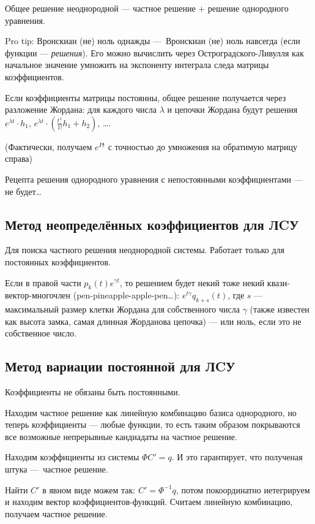 \documentclass[12pt, a4paper]{article}
\begin{document}
Общее решение неоднородной — частное решение + решение однородного уравнения.

Pro tip: Вронскиан (не) ноль однажды — Вронскиан (не) ноль навсегда (если функции — \textit{решения}).
Его можно вычислить через Остроградского-Ливулля как начальное значение умножить на экспоненту интеграла следа матрицы коэффициентов.

Если коэффициенты матрицы постоянны, общее решение получается через разложение Жордана: для каждого числа $\lambda$ и цепочки Жордана будут решения
$e^{\lambda t} \cdot h_1$, $e^{\lambda t} \cdot (\frac{t^{1}}{1!} h_1 + h_2)$, ….

(Фактически, получаем $e^{Pt}$ с точностью до умножения на обратимую матрицу справа)

Рецепта решения однородного уравнения с непостоянными коэффициентами — не будет…

\subsection{Метод неопределённых коэффициентов для ЛCУ}

Для поиска частного решения неоднородной системы.
Работает только для постоянных коэффициентов.

Если в правой части $p_k(t) e^{\gamma t}$, 
то решением будет некий тоже некий квази-вектор-многочлен (pen-pineapple-apple-pen…): 
$e^{t\gamma}q_{k + s}(t)$, где $s$ — максимальный 
размер клетки Жордана для собственного числа $\gamma$ (также известен как высота замка, 
самая длинная Жорданова цепочка)
— или ноль, если это не собственное число.

\subsection{Метод вариации постоянной для ЛCУ}

Коэффициенты не обязаны быть постоянными.

Находим частное решение как линейную комбинацию базиса однородного, но теперь коэффициенты — любые функции, 
то есть таким образом покрываются все возможные непрерывные кандиадаты на частное решение.

Находим коэффициенты из системы $\Phi C' = q$. И это гарантирует, что полученая штука — частное решение.

Найти $C'$ в явном виде можем так: $C' = \Phi^{-1} q$, потом покоординатно иетегрируем и находим вектор коэффициентов-функций.
Считаем линейную комбинацию, получаем частное решение.
\end{document}
